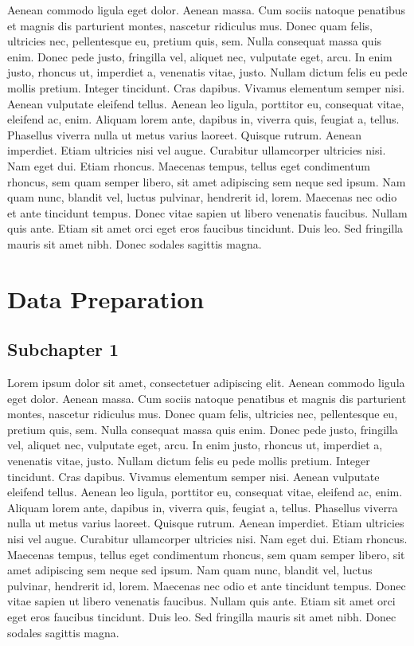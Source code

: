 \documentclass[]{book}
\begin{document}
Aenean commodo ligula eget dolor. Aenean massa. Cum sociis natoque
penatibus et magnis dis parturient montes, nascetur ridiculus mus. Donec
quam felis, ultricies nec, pellentesque eu, pretium quis, sem. Nulla
consequat massa quis enim. Donec pede justo, fringilla vel, aliquet nec,
vulputate eget, arcu. In enim justo, rhoncus ut, imperdiet a, venenatis
vitae, justo. Nullam dictum felis eu pede mollis pretium. Integer
tincidunt. Cras dapibus. Vivamus elementum semper nisi. Aenean vulputate
eleifend tellus. Aenean leo ligula, porttitor eu, consequat vitae,
eleifend ac, enim. Aliquam lorem ante, dapibus in, viverra quis, feugiat
a, tellus. Phasellus viverra nulla ut metus varius laoreet. Quisque
rutrum. Aenean imperdiet. Etiam ultricies nisi vel augue. Curabitur
ullamcorper ultricies nisi. Nam eget dui. Etiam rhoncus. Maecenas
tempus, tellus eget condimentum rhoncus, sem quam semper libero, sit
amet adipiscing sem neque sed ipsum. Nam quam nunc, blandit vel, luctus
pulvinar, hendrerit id, lorem. Maecenas nec odio et ante tincidunt
tempus. Donec vitae sapien ut libero venenatis faucibus. Nullam quis
ante. Etiam sit amet orci eget eros faucibus tincidunt. Duis leo. Sed
fringilla mauris sit amet nibh. Donec sodales sagittis magna.

\chapter{Data Preparation}\label{data-preparation}

\section{Subchapter 1}\label{subchapter-1}

Lorem ipsum dolor sit amet, consectetuer adipiscing elit. Aenean commodo
ligula eget dolor. Aenean massa. Cum sociis natoque penatibus et magnis
dis parturient montes, nascetur ridiculus mus. Donec quam felis,
ultricies nec, pellentesque eu, pretium quis, sem. Nulla consequat massa
quis enim. Donec pede justo, fringilla vel, aliquet nec, vulputate eget,
arcu. In enim justo, rhoncus ut, imperdiet a, venenatis vitae, justo.
Nullam dictum felis eu pede mollis pretium. Integer tincidunt. Cras
dapibus. Vivamus elementum semper nisi. Aenean vulputate eleifend
tellus. Aenean leo ligula, porttitor eu, consequat vitae, eleifend ac,
enim. Aliquam lorem ante, dapibus in, viverra quis, feugiat a, tellus.
Phasellus viverra nulla ut metus varius laoreet. Quisque rutrum. Aenean
imperdiet. Etiam ultricies nisi vel augue. Curabitur ullamcorper
ultricies nisi. Nam eget dui. Etiam rhoncus. Maecenas tempus, tellus
eget condimentum rhoncus, sem quam semper libero, sit amet adipiscing
sem neque sed ipsum. Nam quam nunc, blandit vel, luctus pulvinar,
hendrerit id, lorem. Maecenas nec odio et ante tincidunt tempus. Donec
vitae sapien ut libero venenatis faucibus. Nullam quis ante. Etiam sit
amet orci eget eros faucibus tincidunt. Duis leo. Sed fringilla mauris
sit amet nibh. Donec sodales sagittis magna.
\end{document}
